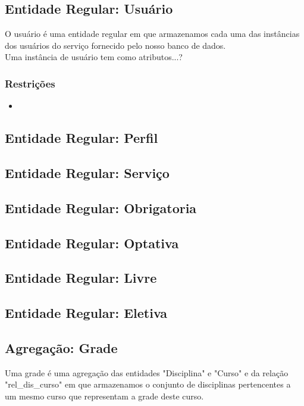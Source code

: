 \documentclass{article}
\begin{document}
  	\subsection{Entidade Regular: Usuário}
  	    \quad O usuário é uma entidade regular em que armazenamos cada uma das instâncias dos usuários do serviço fornecido pelo nosso banco de dados. \\
  	    \quad Uma instância de usuário tem como atributos...?
  	    \subsubsection{Restrições}
  	        \begin{itemize}
  	            \item 
  	        \end{itemize}
  	        
  	\subsection{Entidade Regular: Perfil}
  	
  	
  	
  	\subsection{Entidade Regular: Serviço}
  	
  	\subsection{Entidade Regular: Obrigatoria}
  	
  	\subsection{Entidade Regular: Optativa}
  	
  	\subsection{Entidade Regular: Livre}
  	
  	\subsection{Entidade Regular: Eletiva}
  	
  	
  	\subsection{Agregação: Grade}
  	    \quad Uma grade é uma agregação das entidades "Disciplina" e "Curso" e da relação "rel\_dis\_curso" em que armazenamos o conjunto de disciplinas pertencentes a um mesmo curso que representam a grade deste curso. 
\end{document}
